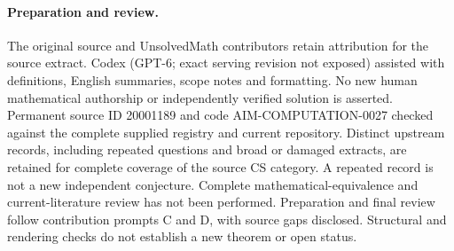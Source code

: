 \documentclass[11pt]{article}
\begin{document}
\paragraph{Preparation and review.}
The original source and UnsolvedMath contributors retain attribution for the source extract. Codex (GPT-6; exact serving revision not exposed) assisted with definitions, English summaries, scope notes and formatting. No new human mathematical authorship or independently verified solution is asserted. Permanent source ID 20001189 and code AIM-COMPUTATION-0027 checked against the complete supplied registry and current repository. Distinct upstream records, including repeated questions and broad or damaged extracts, are retained for complete coverage of the source CS category. A repeated record is not a new independent conjecture. Complete mathematical-equivalence and current-literature review has not been performed. Preparation and final review follow contribution prompts C and D, with source gaps disclosed. Structural and rendering checks do not establish a new theorem or open status.
\label{end:20001189}
\end{document}
